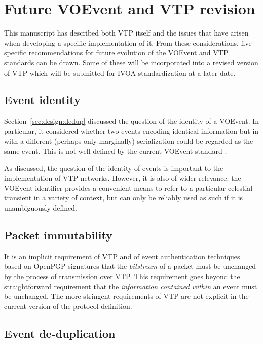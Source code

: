 \documentclass[5p,authoryear]{elsarticle}
\begin{document}
\section{Future VOEvent and VTP revision}
\label{sec:future}

This manuscript has described both VTP itself and the issues that have arisen
when developing a specific implementation of it.  From these considerations,
five specific recommendations for future evolution of the VOEvent and VTP
standards can be drawn. Some of these will be incorporated into a revised
version of VTP which will be submitted for IVOA standardization at a later
date.

\subsection{Event identity}
\label{sec:future:identity}

Section~\ref{sec:design:dedup} discussed the question of the identity of a
VOEvent. In particular, it considered whether two events encoding identical
information but in with a different (perhaps only marginally) serialization
could be regarded as the same event. This is not well defined by the current
VOEvent standard \citep{Seaman:2011}.

As discussed, the question of the identity of events is important to the
implementation of VTP networks. However, it is also of wider relevance: the
VOEvent identifier provides a convenient means to refer to a particular
celestial transient in a variety of context, but can only be reliably used as
such if it is unambiguously defined.

\subsection{Packet immutability}
\label{sec:future:immutability}

It is an implicit requirement of VTP and of event authentication techniques
based on OpenPGP signatures that the \textit{bitstream} of a packet must be
unchanged by the process of transmission over VTP\@. This requirement goes
beyond the straightforward requirement that the \textit{information contained
within} an event must be unchanged. The more stringent requirements of VTP are
not explicit in the current version of the protocol definition.

\subsection{Event de-duplication}
\label{sec:future:dedup}
\end{document}
